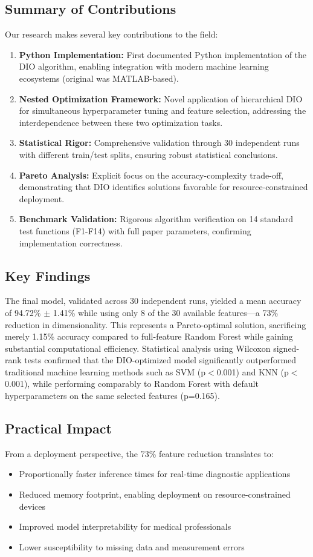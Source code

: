 \documentclass[12pt, a4paper]{article}
\begin{document}
\subsection{Summary of Contributions}
Our research makes several key contributions to the field:
\begin{enumerate}
    \item \textbf{Python Implementation:} First documented Python implementation of the DIO algorithm, enabling integration with modern machine learning ecosystems (original was MATLAB-based).
    \item \textbf{Nested Optimization Framework:} Novel application of hierarchical DIO for simultaneous hyperparameter tuning and feature selection, addressing the interdependence between these two optimization tasks.
    \item \textbf{Statistical Rigor:} Comprehensive validation through 30 independent runs with different train/test splits, ensuring robust statistical conclusions.
    \item \textbf{Pareto Analysis:} Explicit focus on the accuracy-complexity trade-off, demonstrating that DIO identifies solutions favorable for resource-constrained deployment.
    \item \textbf{Benchmark Validation:} Rigorous algorithm verification on 14 standard test functions (F1-F14) with full paper parameters, confirming implementation correctness.
\end{enumerate}

\subsection{Key Findings}
The final model, validated across 30 independent runs, yielded a mean accuracy of 94.72\% $\pm$ 1.41\% while using only 8 of the 30 available features—a 73\% reduction in dimensionality. This represents a Pareto-optimal solution, sacrificing merely 1.15\% accuracy compared to full-feature Random Forest while gaining substantial computational efficiency. Statistical analysis using Wilcoxon signed-rank tests confirmed that the DIO-optimized model significantly outperformed traditional machine learning methods such as SVM (p$<$0.001) and KNN (p$<$0.001), while performing comparably to Random Forest with default hyperparameters on the same selected features (p=0.165).

\subsection{Practical Impact}
From a deployment perspective, the 73\% feature reduction translates to:
\begin{itemize}
    \item Proportionally faster inference times for real-time diagnostic applications
    \item Reduced memory footprint, enabling deployment on resource-constrained devices
    \item Improved model interpretability for medical professionals
    \item Lower susceptibility to missing data and measurement errors
\end{itemize}
\end{document}
